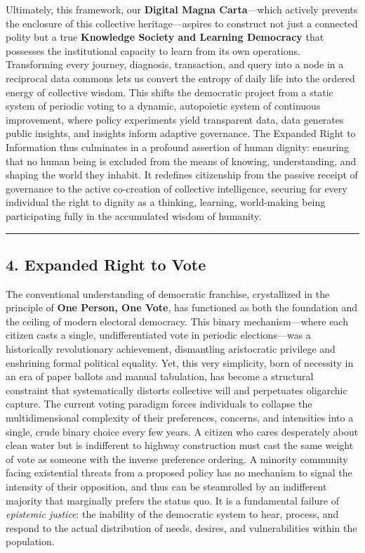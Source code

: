 Ultimately, this framework, our \textbf{Digital Magna Carta}---which
actively prevents the enclosure of this collective heritage---aspires to
construct not just a connected polity but a true \textbf{Knowledge
Society and Learning Democracy} that possesses the institutional
capacity to learn from its own operations. Transforming every journey,
diagnosis, transaction, and query into a node in a reciprocal data
commons lets us convert the entropy of daily life into the ordered
energy of collective wisdom. This shifts the democratic project from a
static system of periodic voting to a dynamic, autopoietic system of
continuous improvement, where policy experiments yield transparent data,
data generates public insights, and insights inform adaptive governance.
The Expanded Right to Information thus culminates in a profound
assertion of human dignity: ensuring that no human being is excluded
from the means of knowing, understanding, and shaping the world they
inhabit. It redefines citizenship from the passive receipt of governance
to the active co-creation of collective intelligence, securing for every
individual the right to dignity as a thinking, learning, world-making
being participating fully in the accumulated wisdom of humanity.

\begin{center}\rule{0.5\linewidth}{0.5pt}\end{center}

\subsection{4. Expanded Right to Vote}\label{expanded-right-to-vote}

The conventional understanding of democratic franchise, crystallized in
the principle of \textbf{One Person, One Vote}, has functioned as both
the foundation and the ceiling of modern electoral democracy. This
binary mechanism---where each citizen casts a single, undifferentiated
vote in periodic elections---was a historically revolutionary
achievement, dismantling aristocratic privilege and enshrining formal
political equality. Yet, this very simplicity, born of necessity in an
era of paper ballots and manual tabulation, has become a structural
constraint that systematically distorts collective will and perpetuates
oligarchic capture. The current voting paradigm forces individuals to
collapse the multidimensional complexity of their preferences, concerns,
and intensities into a single, crude binary choice every few years. A
citizen who cares desperately about clean water but is indifferent to
highway construction must cast the same weight of vote as someone with
the inverse preference ordering. A minority community facing existential
threats from a proposed policy has no mechanism to signal the intensity
of their opposition, and thus can be steamrolled by an indifferent
majority that marginally prefers the status quo. It is a fundamental
failure of \emph{epistemic justice}: the inability of the democratic
system to hear, process, and respond to the actual distribution of
needs, desires, and vulnerabilities within the population.

